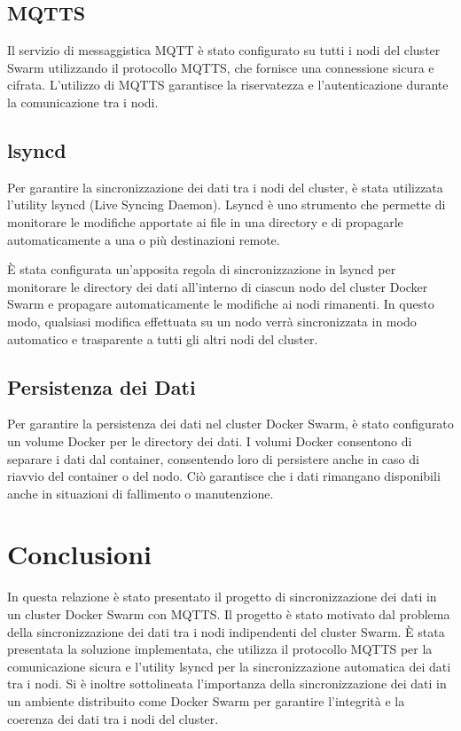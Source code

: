 \documentclass{article}
\begin{document}
\subsection{MQTTS}
Il servizio di messaggistica MQTT è stato configurato su tutti i nodi del cluster 
Swarm utilizzando il protocollo MQTTS, che fornisce una connessione sicura e cifrata. 
L'utilizzo di MQTTS garantisce la riservatezza e l'autenticazione durante la 
comunicazione tra i nodi.

\subsection{lsyncd}
Per garantire la sincronizzazione dei dati tra i nodi del cluster, 
è stata utilizzata l'utility lsyncd (Live Syncing Daemon). Lsyncd è uno strumento 
che permette di monitorare le modifiche apportate ai file in una directory e di 
propagarle automaticamente a una o più destinazioni remote.

È stata configurata un'apposita regola di sincronizzazione in lsyncd per monitorare 
le directory dei dati all'interno di ciascun nodo del cluster Docker Swarm e propagare 
automaticamente le modifiche ai nodi rimanenti. In questo modo, qualsiasi modifica 
effettuata su un nodo verrà sincronizzata in modo automatico e trasparente a tutti 
gli altri nodi del cluster.

\subsection{Persistenza dei Dati}
Per garantire la persistenza dei dati nel cluster Docker Swarm, è stato 
configurato un volume Docker per le directory dei dati. I volumi Docker 
consentono di separare i dati dal container, consentendo loro di persistere 
anche in caso di riavvio del container o del nodo. Ciò garantisce che i dati 
rimangano disponibili anche in situazioni di fallimento o manutenzione.

\section{Conclusioni}
In questa relazione è stato presentato il progetto di sincronizzazione 
dei dati in un cluster Docker Swarm con MQTTS. Il progetto è stato motivato 
dal problema della sincronizzazione dei dati tra i nodi indipendenti del cluster Swarm. 
È stata presentata la soluzione implementata, che utilizza il protocollo MQTTS 
per la comunicazione sicura e l'utility lsyncd per la sincronizzazione automatica 
dei dati tra i nodi. Si è inoltre sottolineata l'importanza della sincronizzazione 
dei dati in un ambiente distribuito come Docker Swarm per garantire l'integrità e 
la coerenza dei dati tra i nodi del cluster.
\end{document}
